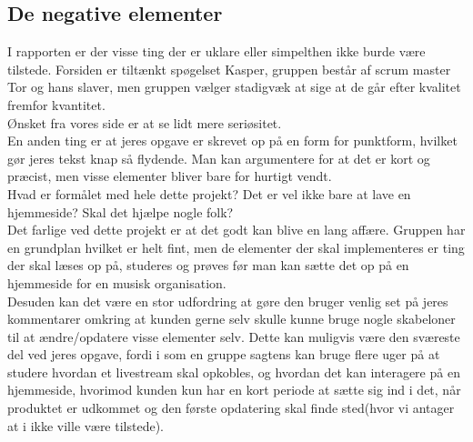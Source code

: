 \documentclass[a4paper]{article}
\begin{document}
\subsection{De negative elementer}
I rapporten er der visse ting der er uklare eller simpelthen ikke burde være tilstede. Forsiden er tiltænkt spøgelset Kasper, gruppen består af scrum master Tor og hans slaver, men gruppen vælger stadigvæk at sige at de går efter kvalitet fremfor kvantitet.\\
Ønsket fra vores side er at se lidt mere seriøsitet. 
\\
En anden ting er at jeres opgave er skrevet op på en form for punktform, hvilket gør jeres tekst knap så flydende. Man kan argumentere for at det er kort og præcist, men visse elementer bliver bare for hurtigt vendt.\\
Hvad er formålet med hele dette projekt? Det er vel ikke bare at lave en hjemmeside? Skal det hjælpe nogle folk? 
\\
Det farlige ved dette projekt er at det godt kan blive en lang affære. Gruppen har en grundplan hvilket er helt fint, men de elementer der skal implementeres er ting der skal læses op på, studeres og prøves før man kan sætte det op på en hjemmeside for en musisk organisation. 
\\
Desuden kan det være en stor udfordring at gøre den bruger venlig set på jeres kommentarer omkring at kunden gerne selv skulle kunne bruge nogle skabeloner til at ændre/opdatere visse elementer selv. Dette kan muligvis være den sværeste del ved jeres opgave, fordi i som en gruppe sagtens kan bruge flere uger på at studere hvordan et livestream skal opkobles, og hvordan det kan interagere på en hjemmeside, hvorimod kunden kun har en kort periode at sætte sig ind i det, når produktet er udkommet og den første opdatering skal finde sted(hvor vi antager at i ikke ville være tilstede).
\end{document}
